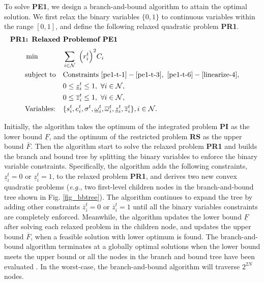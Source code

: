 \documentclass[journal]{IEEEtran}
\begin{document}
	To solve \textbf{PE1}, we design a branch-and-bound algorithm \cite{bilevel} to attain the optimal solution. We first relax the binary variables $\{ 0,1 \}$ to continuous variables within the range $[0,1]$, and define the following relaxed quadratic problem \textbf{PR1}.
	\begin{align*}
		\leftline{\textbf{PR1: Relaxed Problemof PE1}}
	\end{align*}
	\begin{equation*}
		\begin{aligned}
			&\min  
			& & \sum_{i \in \mathcal{N}} ~\Big( r_i^t \Big)^{2} C_i\\
			& \text{subject to}
			& & \text{Constraints}~ \eqref{pe1-t-1}-\eqref{pe1-t-3},~\eqref{pe1-t-6}-\eqref{linearize-4}, \\
			&&& 0 \leq \underline{z}_{i}^{t} \leq 1,~\forall i\in\mathcal {N},\\
			&&& 0 \leq \overline{z}_{i}^{t} \leq 1,~\forall i\in\mathcal {N},\\
			& \text{Variables:} 
			& & \{ s_i^t,e_i^t,\sigma^t,\underline{\omega}_i^t,\overline{\omega}_i^t, \underline{z}_{i}^{t}, \overline{z}_{i}^{t} \}, i \in \mathcal{N}.
		\end{aligned}
	\end{equation*}
	
		
	Initially, the algorithm takes the optimum of the integrated problem \textbf{PI} as the lower bound $\underline{F}$, and the optimum of the restricted problem \textbf{RS} as the upper bound $\overline{F}$. Then the algorithm start to solve the relaxed problem \textbf{PR1} and builds the branch and bound tree by splitting the binary variables to enforce the binary variable constraints. Specifically, the algorithm adds the following constraints, $\underline{z}_{i}^{t}=0$ or $ \underline{z}_{i}^{t}=1$, to the relaxed problem \textbf{PR1}, and derives two new convex quadratic problems (\textit{e.g.}, two first-level children nodes in the branch-and-bound tree shown in Fig. \ref{fig_bbtree}). The algorithm continues to expand the tree by adding other constraints $\overline{z}_{i}^{t}=0$ or $ \overline{z}_{i}^{t}=1$ until all the binary variables constraints are completely enforced. Meanwhile, the algorithm updates the lower bound $\underline{F}$ after solving each relaxed problem in the children node, and updates the upper bound $\overline{F}$, when a feasible solution with lower optimum is found. The branch-and-bound algorithm terminates at a globally optimal solutions when the lower bound meets the upper bound or all the nodes in the branch and bound tree have been evaluated \cite{bilevel}. In the worst-case, the branch-and-bound algorithm will traverse $2^{2N}$ nodes.
	
\end{document}
